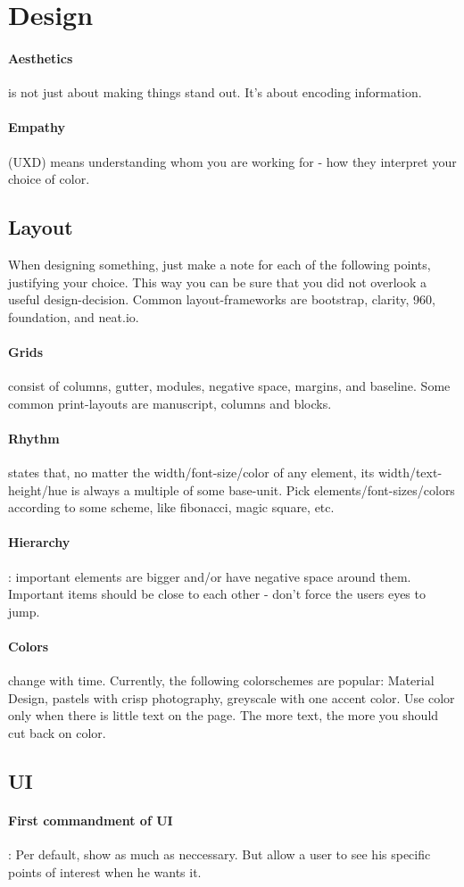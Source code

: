 \section{Design}

\paragraph{Aesthetics} is not just about making things stand out. It's about encoding information.
\paragraph{Empathy} (UXD) means understanding whom you are working for - how they interpret your choice of color.

\subsection{Layout}

When designing something, just make a note for each of the following points, justifying your choice. This way you can be sure that you did not overlook a useful design-decision.
Common layout-frameworks are bootstrap, clarity, 960, foundation, and neat.io.

\paragraph{Grids} consist of columns, gutter, modules, negative space, margins, and baseline. Some common print-layouts are manuscript, columns and blocks.
\paragraph{Rhythm} states that, no matter the width/font-size/color of any element, its width/text-height/hue is always a multiple of some base-unit. Pick elements/font-sizes/colors according to some scheme, like fibonacci, magic square, etc. 
\paragraph{Hierarchy}: important elements are bigger and/or have negative space around them. Important items should be close to each other - don't force the users eyes to jump.
\paragraph{Colors} change with time. Currently, the following colorschemes are popular: Material Design, pastels with crisp photography, greyscale with one accent color. Use color only when there is little text on the page. The more text, the more you should cut back on color.

\subsection{UI}

\paragraph{First commandment of UI}: Per default, show as much as neccessary. But allow a user to see his specific points of interest when he wants it.